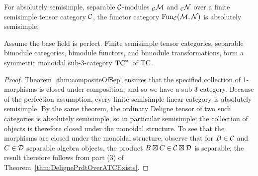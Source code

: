 \documentclass{amsart}
\begin{document}



\begin{corollary} \label{cor:funsemi}
For absolutely semisimple, separable $\mathcal C$-modules ${}_\mathcal C \mathcal M$ and ${}_\mathcal C \mathcal N$ over a finite semisimple tensor category $\mathcal C$, the functor category $\operatorname{Fun}_{\mathcal C}(\mathcal M,\mathcal N)$ is absolutely semisimple.
\end{corollary}

\begin{corollary} \label{cor:septc}
Assume the base field is perfect.  Finite semisimple tensor categories, separable bimodule categories, bimodule functors, and bimodule transformations, form a symmetric monoidal sub-3-category ${\mathrm{TC}^{\mathrm{ss}}}$ of $\mathrm{TC}$.
\end{corollary}
\begin{proof}
Theorem~\ref{thm:compositeOfSep} ensures that the specified collection of 1-morphisms is closed under composition, and so we have a sub-3-category.  Because of the perfection assumption, every finite semisimple linear category is absolutely semisimple.  By the same theorem, the ordinary Deligne tensor of two such categories is absolutely semisimple, so in particular semisimple; the collection of objects is therefore closed under the monoidal structure.  To see that the morphisms are closed under the monoidal structure, observe that for $B \in \mathcal C$ and $C \in \mathcal D$ separable algebra objects, the product $B \boxtimes C \in \mathcal C \boxtimes \mathcal D$ is separable; the result therefore follows from part (3) of Theorem~\ref{thm:DelignePrdtOverATCExists}.
\end{proof}
\end{document}
